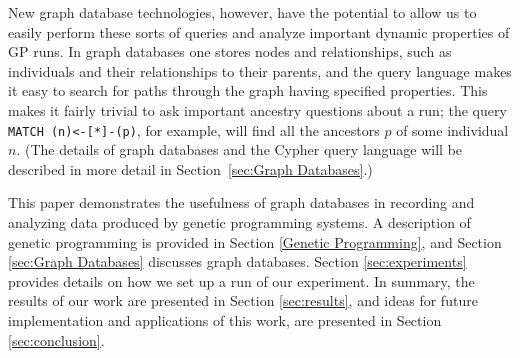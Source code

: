 \documentclass[12pt]{article}
\begin{document}
New graph database technologies, however, have the potential to allow us to easily perform these sorts of queries and analyze important dynamic properties of GP runs. In graph databases one stores nodes and relationships, such as individuals and their relationships to their parents, and the query language makes it easy to search for paths through the graph having specified properties. This makes it fairly trivial to ask important ancestry questions about a run; the query \texttt{MATCH (n)<-[*]-(p)}, for example, will find all the ancestors $p$ of some individual $n$. (The details of graph databases and the Cypher query language will be described in more detail in Section~\ref{sec:Graph Databases}.)

This paper demonstrates the usefulness of graph databases in recording and analyzing data produced by genetic programming systems. A description of genetic programming is provided in Section \ref{Genetic Programming}, and Section \ref{sec:Graph Databases} discusses graph databases. Section \ref{sec:experiments} provides details on how we set up a run of our experiment. In summary, the results of our work are presented in Section \ref{sec:results}, and ideas for future implementation and applications of this work, are presented in Section \ref{sec:conclusion}.






\end{document}
